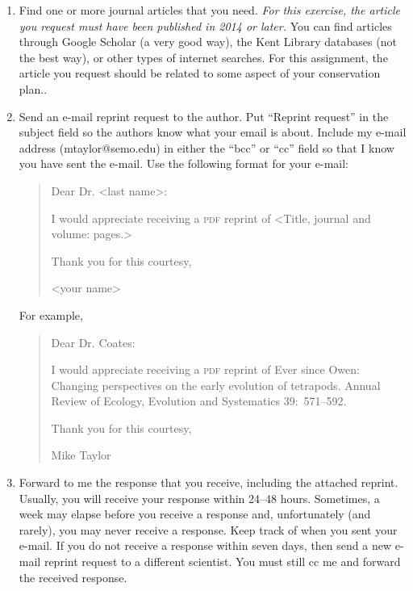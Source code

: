 \documentclass[12pt]{article}
\begin{document}
\begin{enumerate}[leftmargin=*]

\item Find one or more journal articles that you need. \emph{For this exercise, the
article you request must have been published in 2014 or later.} You can
find articles through Google
Scholar (a very good way), the Kent Library databases (not the best way), or other types of internet searches. For
this assignment, the article you request should be related to some 
aspect of your conservation plan..

\item Send an e-mail reprint request to the author. Put ``Reprint request'' in the subject field so the authors know what your email is about. Include my
e-mail address (mtaylor@semo.edu) in either the ``bcc'' or ``cc'' field
so that I know you have sent the e-mail. Use the following format for
your e-mail:

\begin{quote}
Dear Dr. \textless{}last name\textgreater{}:\vspace*{0.5\baselineskip}

I would appreciate receiving a \textsc{pdf} reprint of 
\textless{}Title, journal and volume: pages.\textgreater{} \vspace*{0.5\baselineskip}

Thank you for this courtesy, \vspace*{0.5\baselineskip}

\textless{}your name\textgreater{}
\end{quote}

\newpage

For example,

\begin{quote}
Dear Dr. Coates:\vspace*{0.5\baselineskip}

I would appreciate receiving a \textsc{pdf} reprint of %
Ever since Owen: Changing perspectives on the early evolution of
tetrapods. Annual Review of Ecology, Evolution and Systematics 39:~571--592.\vspace*{0.5\baselineskip}

Thank you for this courtesy,\vspace*{0.5\baselineskip}

Mike Taylor
\end{quote}

\item Forward to me the response that you receive, including the
attached reprint. Usually, you will receive your response within 24–48
hours. Sometimes, a week may elapse before you receive a response and,
unfortunately (and rarely), you may never receive a response. Keep track
of when you sent your e-mail. If you do not receive a response within
seven days, then send a new e-mail reprint request to a different
scientist. You must still cc me and forward the received response.


\end{enumerate}
\end{document}
